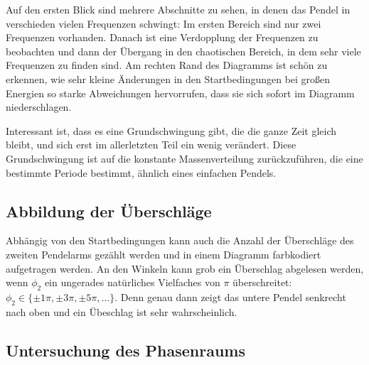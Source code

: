 Auf den ersten Blick sind mehrere Abschnitte zu sehen, in denen das Pendel in verschieden vielen Frequenzen schwingt: Im ersten Bereich sind nur zwei Frequenzen vorhanden. Danach ist eine Verdopplung der Frequenzen zu beobachten und dann der Übergang in den chaotischen Bereich, in dem sehr viele Frequenzen zu finden sind. Am rechten Rand des Diagramms ist schön zu erkennen, wie sehr kleine Änderungen in den Startbedingungen bei großen Energien so starke Abweichungen hervorrufen, dass sie sich sofort im Diagramm niederschlagen.

Interessant ist, dass es eine Grundschwingung gibt, die die ganze Zeit gleich bleibt, und sich erst im allerletzten Teil ein wenig verändert.
Diese Grundschwingung ist auf die konstante Massenverteilung zurückzuführen, die eine bestimmte Periode bestimmt, ähnlich eines einfachen Pendels.

\subsection{Abbildung der Überschläge}

Abhängig von den Startbedingungen kann auch die Anzahl der Überschläge des zweiten Pendelarms gezählt werden und in einem Diagramm farbkodiert aufgetragen werden.
An den Winkeln kann grob ein Überschlag abgelesen werden, wenn $\phi_2$ ein ungerades natürliches Vielfaches von $\pi$ überschreitet: $\phi_2 \in \{ \pm 1 \pi, \pm 3 \pi, \pm 5 \pi, ... \}$.
Denn genau dann zeigt das untere Pendel senkrecht nach oben und ein Übeschlag ist sehr wahrscheinlich.


\subsection{Untersuchung des Phasenraums}




